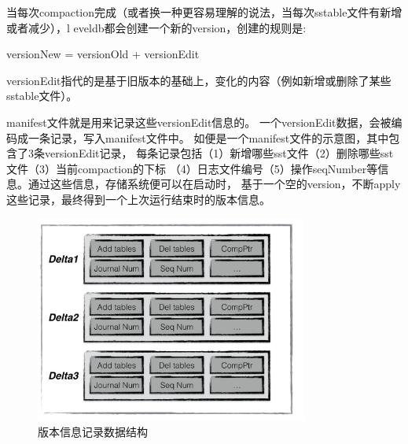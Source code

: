 		当每次compaction完成（或者换一种更容易理解的说法，当每次sstable文件有新增或者减少），l
		eveldb都会创建一个新的version，创建的规则是:

		versionNew = versionOld + versionEdit

		versionEdit指代的是基于旧版本的基础上，变化的内容（例如新增或删除了某些sstable文件）。

		manifest文件就是用来记录这些versionEdit信息的。
		一个versionEdit数据，会被编码成一条记录，写入manifest文件中。
		如便是一个manifest文件的示意图，其中包含了3条versionEdit记录，
		每条记录包括（1）新增哪些sst文件（2）删除哪些sst文件（3）当前compaction的下标
		（4）日志文件编号（5）操作seqNumber等信息。通过这些信息，存储系统便可以在启动时，
		基于一个空的version，不断apply这些记录，最终得到一个上次运行结束时的版本信息。

		\begin{figure}[H]
			\centering
			\includegraphics[width=0.80\textwidth]{images/manifest}
			\caption{版本信息记录数据结构}
			\label{radds_storage_manifest}
		\end{figure}

	
	
